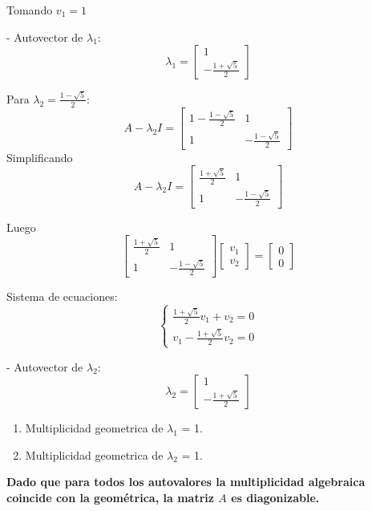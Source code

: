 \documentclass{article}
\begin{document}
Tomando \( v_1 = 1 \)

- Autovector de \( \lambda_1 \):
\[
 \lambda_1 =
\begin{bmatrix}
1 \\
-\frac{1 + \sqrt{5}}{2}
\end{bmatrix}
\]

Para \( \lambda_2 = \frac{1 - \sqrt{5}}{2} \):
\[
A - \lambda_2 I = \begin{bmatrix}
1 - \frac{1 - \sqrt{5}}{2} & 1 \\
1 & -\frac{1 - \sqrt{5}}{2}
\end{bmatrix}
\]
Simplificando
\[
A - \lambda_2 I = \begin{bmatrix}
\frac{1 + \sqrt{5}}{2} & 1 \\
1 & -\frac{1 - \sqrt{5}}{2}
\end{bmatrix}
\]

Luego
\[
\begin{bmatrix}
\frac{1 + \sqrt{5}}{2} & 1 \\
1 & -\frac{1 - \sqrt{5}}{2}
\end{bmatrix}
\begin{bmatrix}
v_1 \\
v_2
\end{bmatrix}
=
\begin{bmatrix}
0 \\
0
\end{bmatrix}
\]

Sistema de ecuaciones:
\[
\left\{
\begin{array}{l}
\frac{1 + \sqrt{5}}{2} v_1 + v_2 = 0 \\
v_1 - \frac{1 + \sqrt{5}}{2} v_2 = 0
\end{array}
\right.
\]

- Autovector de \( \lambda_2 \):
\[
\lambda_2 =
\begin{bmatrix}
1 \\
-\frac{1 + \sqrt{5}}{2}
\end{bmatrix}
\]

\begin{enumerate}
    \item Multiplicidad geometrica de \( \lambda_1 \) = 1.
    \item Multiplicidad geometrica de \( \lambda_2 \) = 1.
\end{enumerate}

{\bfseries Dado que para todos los autovalores la multiplicidad algebraica coincide con la geométrica, la matriz $A$ es diagonizable.} 
\end{document}
